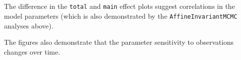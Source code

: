 \documentclass[11pt]{article}
\begin{document}
    \begin{center}
    \end{center}
    { \hspace*{\fill} \\}
    
    \begin{center}
    \end{center}
    { \hspace*{\fill} \\}
    
    \begin{Verbatim}[commandchars=\\\{\}]

    \end{Verbatim}

    \begin{center}
    \end{center}
    { \hspace*{\fill} \\}
    
    \begin{Verbatim}[commandchars=\\\{\}]

    \end{Verbatim}

    \begin{center}
    \end{center}
    { \hspace*{\fill} \\}
    
    \begin{Verbatim}[commandchars=\\\{\}]

    \end{Verbatim}

    The difference in the \texttt{total} and \texttt{main} effect plots
suggest correlations in the model parameters (which is also demonstrated
by the \texttt{AffineInvariantMCMC} analyses above).

The figures also demonstrate that the parameter sensitivity to
observations changes over time.
\end{document}
